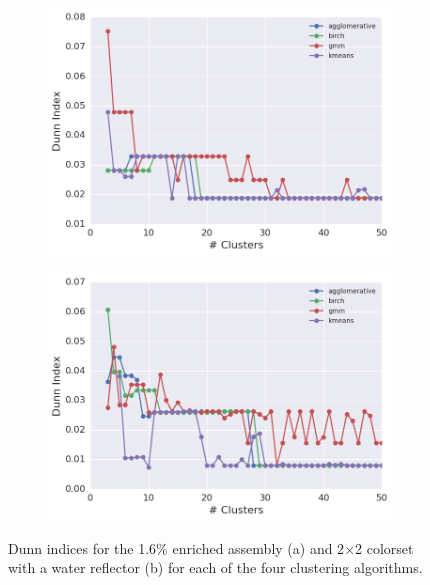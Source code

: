 \begin{figure}[h!]
\centering
\begin{subfigure}{\textwidth}
  \centering
\includegraphics[width=0.9\linewidth]{figures/results/model-select/assm-16/dunn-combined-U238-capture-1}
\vspace{2mm}
  \caption{}
  \label{fig:chap11-assm-16-dunn-index}
\end{subfigure}
\begin{subfigure}{\textwidth}
  \centering
\includegraphics[width=0.9\linewidth]{figures/results/model-select/reflector/dunn-combined-U238-nu-fission-1}
  \caption{}
\label{fig:chap11-refl-dunn-index}
\end{subfigure}
\caption[Dunn index variation with the number of clusters]{Dunn indices for the 1.6\% enriched assembly (a) and 2$\times$2 colorset with a water reflector (b) for each of the four clustering algorithms.}
\label{fig:chap11-dunn-indices}
\end{figure}

